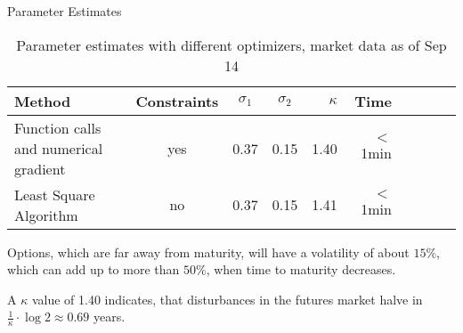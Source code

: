 {Parameter Estimates}
 \begin{table}[btp]
 \begin{center}
\begin{tabular}{p{4cm}cccrrrrcc}
Method  &Constraints    &$\sigma_1$ &$\sigma_2$ &$\kappa$   &Time&\\
\hline
Function calls and numerical gradient       &yes            &0.37       &0.15       &1.40       &$<$1min&\\
Least Square Algorithm  &no&0.37&0.15&1.41      &$<$1min&\\
\end{tabular}
\caption{Parameter estimates with different optimizers, market data as of Sep 14}
\label{fig:estimates18}
\end{center}
\end{table}

Options, which are far away from maturity, will have a volatility of about $15\%$,
which can add up to more than $50\%$, when time to maturity decreases.

A $\kappa$ value of 1.40 indicates, that disturbances in the futures market
halve in $\frac{1}{\kappa}\cdot \log 2 \approx 0.69$ years.

